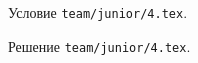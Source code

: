 \problem{}
Условие \texttt{team/junior/4.tex}.

\solution Решение \texttt{team/junior/4.tex}.
\endproblem
